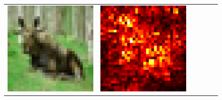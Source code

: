 \documentclass[preprint,12pt]{elsarticle}
\begin{document}
\begin{figure}[p]
\begin{tabular}{cccccc}
  \includegraphics[scale=\scale]{../visualizations/examples/cifar10/cnn/images/4.png} &
  \includegraphics[scale=\scale]{../visualizations/examples/cifar10/cnn/saliency_map/4.png} & 

\end{tabular}
\end{figure}
\end{document}
